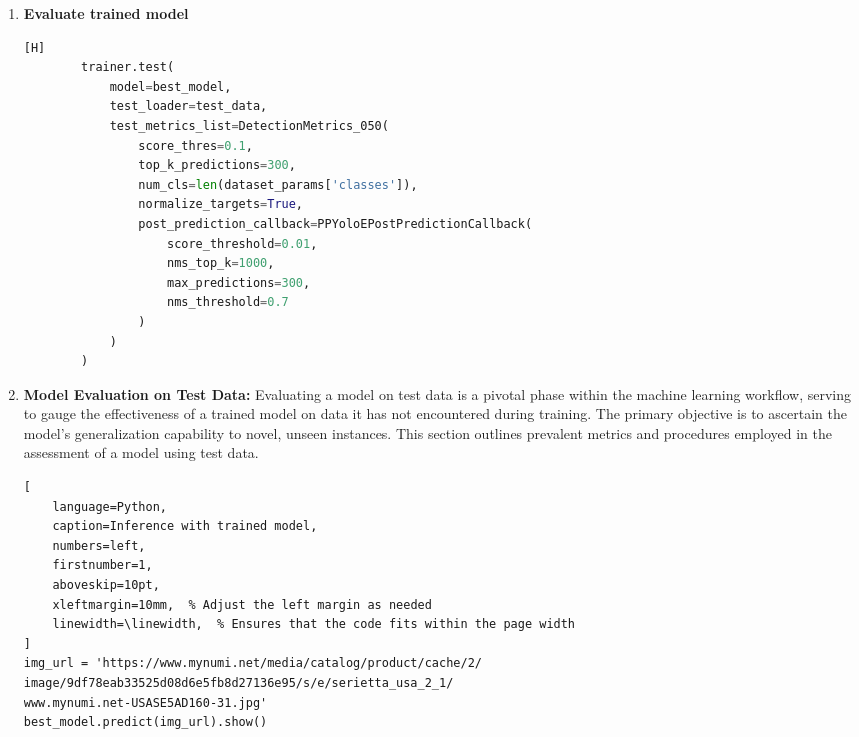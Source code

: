 \begin{enumerate}
\begin{addmargin}[8mm]{0mm}
\begin{lstlisting}[language=Python, caption=Load trained model][H]
    # Path to the averaged checkpoint
    averaged_checkpoint_path = 'checkpoints/my_first_yolonas_run
                    /average_model.pth'
    
    # Retrieve the model with averaged weights
    best_model = models.get('yolo_nas_l', 
                            num_classes=len(dataset_params['classes']),
                            checkpoint_path=averaged_checkpoint_path)
        
    \end{lstlisting}
    \end{addmargin}
    \item \textbf{Evaluate trained model}
    \begin{addmargin}[8mm]{0mm}
    \begin{lstlisting}[language=Python, caption=Model Evaluation on Test Data][H]
        trainer.test(
            model=best_model,
            test_loader=test_data,
            test_metrics_list=DetectionMetrics_050(
                score_thres=0.1,
                top_k_predictions=300,
                num_cls=len(dataset_params['classes']),
                normalize_targets=True,
                post_prediction_callback=PPYoloEPostPredictionCallback(
                    score_threshold=0.01,
                    nms_top_k=1000,
                    max_predictions=300,
                    nms_threshold=0.7
                )
            )
        )
    \end{lstlisting}
    \end{addmargin}
    \item \textbf{Model Evaluation on Test Data: } Evaluating a model on test data is a pivotal phase within the machine learning workflow, serving to gauge the effectiveness of a trained model on data it has not encountered during training. The primary objective is to ascertain the model's generalization capability to novel, unseen instances. This section outlines prevalent metrics and procedures employed in the assessment of a model using test data.
\begin{addmargin}[8mm]{0mm} 
\begin{lstlisting}[
    language=Python,
    caption=Inference with trained model,
    numbers=left,
    firstnumber=1,
    aboveskip=10pt,
    xleftmargin=10mm,  % Adjust the left margin as needed
    linewidth=\linewidth,  % Ensures that the code fits within the page width
]
img_url = 'https://www.mynumi.net/media/catalog/product/cache/2/
image/9df78eab33525d08d6e5fb8d27136e95/s/e/serietta_usa_2_1/
www.mynumi.net-USASE5AD160-31.jpg'
best_model.predict(img_url).show()     
\end{lstlisting}
\end{addmargin}


    

\end{enumerate}